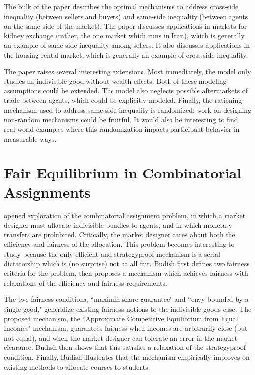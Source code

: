 \documentclass[JEL]{AEA}
\begin{document}
The bulk of the paper describes the optimal mechanisms to address cross-side inequality (between sellers and buyers) and same-side inequality (between agents on the same side of the market). The paper discusses applications in markets for kidney exchange (rather, the one market which runs in Iran), which is generally an example of same-side inequality among sellers. It also discusses applications in the housing rental market, which is generally an example of cross-side inequality.


The paper raises several interesting extensions. Most immediately, the model only studies an indivisible good without wealth effects. Both of these modeling assumptions could be extended. The model also neglects possible aftermarkets of trade between agents, which could be explicitly modeled. Finally, the rationing mechanism used to address same-side inequality is randomized; work on designing non-random mechanisms could be fruitful. It would also be interesting to find real-world examples where this randomization impacts participant behavior in measurable ways.

\section{Fair Equilibrium in Combinatorial Assignments}

\cite{budish-2011} opened exploration of the combinatorial assignment problem, in which a market designer must allocate indivisible bundles to agents, and in which monetary transfers are prohibited. Critically, the market designer cares about both the efficiency and fairness of the allocation. This problem becomes interesting to study because the only efficient and strategyproof mechanism is a serial dictatorship which is (no surprise) not at all fair. Budish first defines two fairness criteria for the problem, then proposes a mechanism which achieves fairness with relaxations of the efficiency and fairness requirements.

The two fairness conditions, ``maximin share guarantee" and ``envy bounded by a single good," generalize existing fairness notions to the indivisible goods case. The proposed mechanism, the ``Approximate Competitive Equilibrium from Equal Incomes" mechanism, guarantees fairness when incomes are arbitrarily close (but not equal), and when the market designer can tolerate an error in the market clearance. Budish then shows that this satisfies a relaxation of the strategyproof condition. Finally, Budish illustrates that the mechanism empirically improves on existing methods to allocate courses to students.
\end{document}
